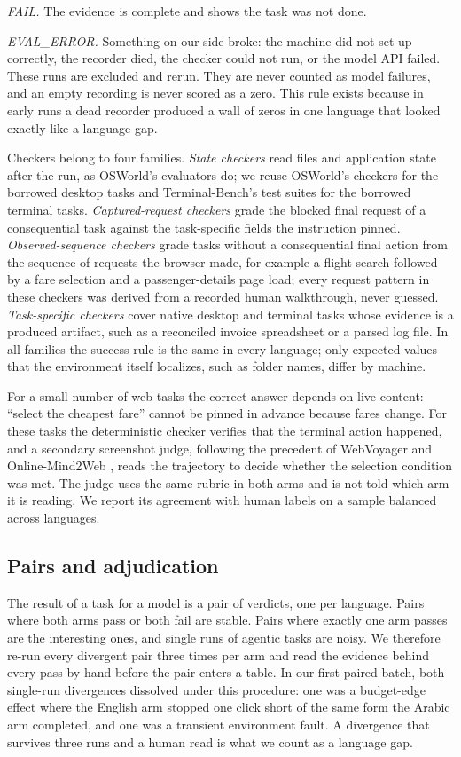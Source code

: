 \textit{FAIL.} The evidence is complete and shows the task was not done.

\textit{EVAL\_ERROR.} Something on our side broke: the machine did not set
up correctly, the recorder died, the checker could not run, or the model API
failed. These runs are excluded and rerun. They are never counted as model
failures, and an empty recording is never scored as a zero. This rule exists
because in early runs a dead recorder produced a wall of zeros in one language
that looked exactly like a language gap.

Checkers belong to four families. \textit{State checkers} read files and
application state after the run, as OSWorld's evaluators do; we reuse
OSWorld's checkers for the borrowed desktop tasks and Terminal-Bench's test
suites for the borrowed terminal tasks. \textit{Captured-request checkers}
grade the blocked final request of a consequential task against the
task-specific fields the instruction pinned. \textit{Observed-sequence
checkers} grade tasks without a consequential final action from the sequence
of requests the browser made, for example a flight search followed by a fare
selection and a passenger-details page load; every request pattern in these
checkers was derived from a recorded human walkthrough, never guessed.
\textit{Task-specific checkers} cover native desktop and terminal tasks whose
evidence is a produced artifact, such as a reconciled invoice spreadsheet or a
parsed log file. In all families the success rule is the same in every
language; only expected values that the environment itself localizes, such as
folder names, differ by machine.

For a small number of web tasks the correct answer depends on live content:
``select the cheapest fare'' cannot be pinned in advance because fares change.
For these tasks the deterministic checker verifies that the terminal action
happened, and a secondary screenshot judge, following the precedent of
WebVoyager and Online-Mind2Web \citep{xue2025illusion}, reads the trajectory
to decide whether the selection condition was met. The judge uses the same
rubric in both arms and is not told which arm it is reading. We report its
agreement with human labels on a sample balanced across languages.

\subsection{Pairs and adjudication}
\label{sec:pairs}

The result of a task for a model is a pair of verdicts, one per language.
Pairs where both arms pass or both fail are stable. Pairs where exactly one arm
passes are the interesting ones, and single runs of agentic tasks are noisy. We
therefore re-run every divergent pair three times per arm and read the
evidence behind every pass by hand before the pair enters a table. In our
first paired batch, both single-run divergences dissolved under this
procedure: one was a budget-edge effect where the English arm stopped one
click short of the same form the Arabic arm completed, and one was a transient
environment fault. A divergence that survives three runs and a human read is
what we count as a language gap.

